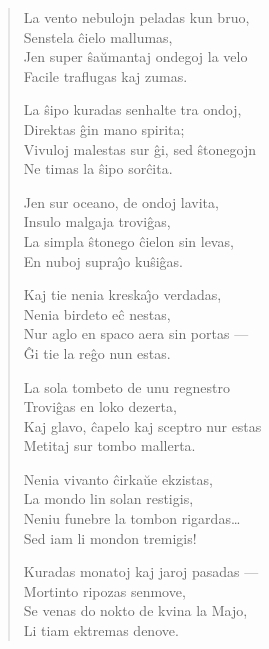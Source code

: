 \begin{verse}
                   \vin  La vento nebulojn peladas kun bruo,\\
                  Senstela \^cielo mallumas,\\
                  Jen super \^sa\u umantaj ondegoj la velo\\
                  Facile traflugas kaj zumas.

                   \vin  La \^sipo kuradas senhalte tra ondoj,\\
                  Direktas \^gin mano spirita;\\
                  Vivuloj malestas sur \^gi, sed \^stonegojn\\
                  Ne timas la \^sipo sor\^cita.

                   \vin  Jen sur oceano, de ondoj lavita,\\
                  Insulo malgaja trovi\^gas,\\
                  La simpla \^stonego \^cielon sin levas,\\
                  En nuboj supra\^{\j}o ku\^si\^gas.

                   \vin  Kaj tie nenia kreska\^{\j}o verdadas,\\
                  Nenia birdeto e\^c nestas,\\
                  Nur aglo en spaco aera sin portas ---\\
                  \^Gi tie la re\^go nun estas.

                   \vin  La sola tombeto de unu regnestro\\
                  Trovi\^gas en loko dezerta,\\
                  Kaj glavo, \^capelo kaj sceptro nur estas\\
                  Metitaj sur tombo mallerta.

                  \vin   Nenia vivanto \^cirka\u ue ekzistas,\\
                  La mondo lin solan restigis,\\
                  Neniu funebre la tombon rigardas\dots\\
                  Sed iam li mondon tremigis!

                  \vin  Kuradas monatoj kaj jaroj pasadas ---\\
                  Mortinto ripozas senmove,\\
                  Se venas do nokto de kvina la Majo,\\
                  Li tiam ektremas denove.


\end{verse}
